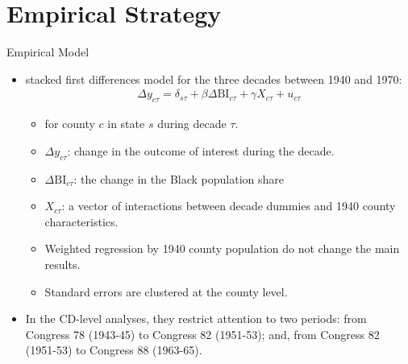\documentclass[dvipdfmx,11pt]{beamer}
\begin{document}
\section{Empirical Strategy}
\frame{\sectionpage}

\begin{frame}{Empirical Model}
  \begin{itemize}
    \item stacked first differences model for the three decades between 1940 and 1970:
    \begin{align*}
      \Delta y_{c \tau} = \delta_{s\tau} + \beta \Delta \text{BI}_{c \tau} + \gamma X_{c\tau} + u_{c \tau}
    \end{align*}
    \begin{itemize}
      \item for county $c$ in state $s$ during decade $\tau$.
      \item $\Delta y_{c \tau}$: change in the outcome of interest during the decade.
      \item $\Delta \text{BI}_{c \tau}$: the change in the Black population share
      \item $X_{c\tau}$: a vector of interactions between decade dummies and 1940 county characteristics.
      \item Weighted regression by 1940 county population do not change the main results.
      \item Standard errors are clustered at the county level.
    \end{itemize}
    \item In the CD-level analyses, they restrict attention to two periods: from Congress 78 (1943-45) to Congress 82 (1951-53); and, from Congress 82 (1951-53) to Congress 88 (1963-65).
  \end{itemize}
\end{frame}
\end{document}
